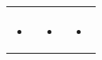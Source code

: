 \documentclass[
ngerman,
paper=a4,
asymmetric,
fontsize=9pt,
draft=false,
parskip=half,
footnotes=multiple,
toc=flat,
]{scrbook}
\newcommand{\DreiSpalten}[3]{
\begin{tabularx}{\linewidth}{XXX}
\TabSub{Anamnese}
&
\TabSub{Untersuchungen}
&
\TabSub{Maßnahmen}
\\
#1
&
#2
&
#3
\end{tabularx}
}
\begin{document}
{}
{%
\DreiSpalten
{%
\begin{itemize}
  \item 
\end{itemize}
}{%
\begin{itemize}
  \item 
\end{itemize}
}{%
\begin{itemize}
  \item 
\end{itemize}
}
}

\end{document}

